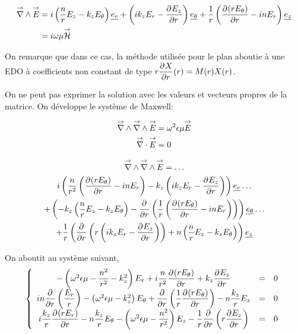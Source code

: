 \begin{align}
    \vrot \vE &= i\left(\frac{n}{r}E_z - k_zE_\theta\right)\v{e_r} + 
    \left(ik_zE_r - \ddr{r}{E_z}\right)\v{e_\theta} +
    \frac{1}{r}\left(\ddr{r}{(rE_\theta)}-inE_r\right)\v{e_z}
    \\
    &=i\w\mu \vH
\end{align}

On remarque que dans ce cas, la méthode utilisée pour le plan aboutie à une EDO à coefficients non constant de type $r\ddr{r}{X}(r) = M(r)X(r)$.



On ne peut pas exprimer la solution avec les valeurs et vecteurs propres de la matrice. 
On développe le système de Maxwell:

\begin{align}
    \vrot \vrot \vE &= \w^2\eps\mu \vE
    \\
    \vdiv \vE &= 0
\end{align}

\begin{multline}
    \vrot \vrot \vE = \dots\\
    i\left(\frac{n}{r^2}\left(\ddr{r}{(rE_\theta)} - inE_r\right) - k_z\left(ik_zE_r - \ddr{r}{E_z}\right)\right)    \v{e_r} \dots\\ 
    + \left(-k_z\left(\frac{n}{r}E_z - k_zE_\theta\right) -\ddr{r}{}\left(\frac{1}{r}\left(\ddr{r}{(rE_\theta)}-inE_r\right)\right)\right)    \v{e_\theta} \dots\\
    + \frac{1}{r}\left(\ddr{r}{} \left(r\left(ik_zE_r - \ddr{r}{E_z}\right)\right) + n \left(\frac{n}{r}E_z - k_zE_\theta\right)\right) \v{e_z}
\end{multline}

On aboutit au système suivant,
\begin{equation}
    \left\lbrace
    \begin{array}{ccc}
        -\left(\w^2\eps\mu -\frac{n^2}{r^2}  - k_z^2\right)E_r  +i\frac{n}{r^2}\ddr{r}{(rE_\theta)}  +k_z\ddr{r}{E_z} & = & 0\\
        in\ddr{r}{}\left(\frac{E_r}{r}\right) -\left(\w^2\eps\mu - k_z^2\right)E_\theta + \ddr{r}{}\left(\frac{1}{r}\ddr{r}{(rE_\theta)}\right)  - n\frac{k_z}{r}E_z & = & 0\\
        i\frac{k_z}{r}\ddr{r}{(rE_r)}  - n\frac{k_z}{r}E_\theta  -\left(\w^2\eps\mu - \frac{n^2}{r^2} \right)E_z - \frac{1}{r}\ddr{r}{}\left(r\ddr{r}{E_z}\right) & = & 0
    \end{array}
    \right.
\end{equation}

